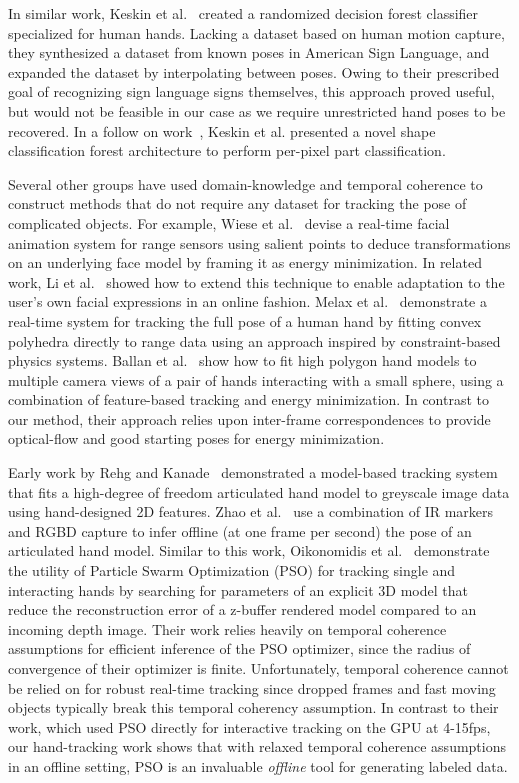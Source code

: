 In similar work, Keskin et al.~\cite{keskin:2011} created a randomized decision forest classifier specialized for human hands. Lacking a dataset based on human motion capture, they synthesized a dataset from known poses in American Sign Language, and expanded the dataset by interpolating between poses. Owing to their prescribed goal of recognizing sign language signs themselves, this approach proved useful, but would not be feasible in our case as we require unrestricted hand poses to be recovered. In a follow on work~\cite{keskin:2012}, Keskin et al. presented a novel shape classification forest architecture to perform per-pixel part classification.

Several other groups have used domain-knowledge and temporal coherence to construct methods that do not require any dataset for tracking the pose of complicated objects. For example, Wiese et al.~\cite{weise09face} devise a real-time facial animation system for range sensors using salient points to deduce transformations on an underlying face model by framing it as energy minimization. In related work, Li et al.~\cite{hao_li_1} showed how to extend this technique to enable adaptation to the user's own facial expressions in an online fashion. Melax et al.~\cite{Melax:2013} demonstrate a real-time system for tracking the full pose of a human hand by fitting convex polyhedra directly to range data using an approach inspired by constraint-based physics systems. Ballan et al.~\cite{Ballan2012} show how to fit high polygon hand models to multiple camera views of a pair of hands interacting with a small sphere, using a combination of feature-based tracking and energy minimization. In contrast to our method, their approach relies upon inter-frame correspondences to provide optical-flow and good starting poses for energy minimization.

Early work by Rehg and Kanade~\cite{Rehg} demonstrated a model-based tracking system that fits a high-degree of freedom articulated hand model to greyscale image data using hand-designed 2D features. Zhao et al.~\cite{Zhao:2012} use a combination of IR markers and RGBD capture to infer offline (at one frame per second) the pose of an articulated hand model. Similar to this work, Oikonomidis et al.~\cite{bmvc2011oikonom} demonstrate the utility of Particle Swarm Optimization (PSO) for tracking single and interacting hands by searching for parameters of an explicit 3D model that reduce the reconstruction error of a z-buffer rendered model compared to an incoming depth image. Their work relies heavily on temporal coherence assumptions for efficient inference of the PSO optimizer, since the radius of convergence of their optimizer is finite. Unfortunately, temporal coherence cannot be relied on for robust real-time tracking since dropped frames and fast moving objects typically break this temporal coherency assumption. In contrast to their work, which used PSO directly for interactive tracking on the GPU at 4-15fps, our hand-tracking work shows that with relaxed temporal coherence assumptions in an offline setting, PSO is an invaluable \emph{offline} tool for generating labeled data.

